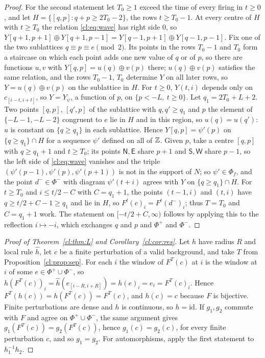 \begin{proof}
For the second statement let $T_0\ge1$ exceed the time of every firing in $t\ge0$, and let $H=\{[q,p]:q+p\ge2T_0-2\}$, the rows $t\ge T_0-1$. At every centre of $H$ with $t\ge T_0$ the relation \eqref{cl:eq:wave} has right side $0$, so $Y[q+1,p+1]\oplus Y[q+1,p-1]=Y[q-1,p+1]\oplus Y[q-1,p-1]$. Fix one of the two sublattices $q\equiv p\equiv e\pmod2$. Its points in the rows $T_0-1$ and $T_0$ form a staircase on which each point adds one new value of $q$ or of $p$, so there are functions $u,v$ with $Y[q,p]=u(q)\oplus v(p)$ there; $u(q)\oplus v(p)$ satisfies the same relation, and the rows $T_0-1$, $T_0$ determine $Y$ on all later rows, so $Y=u(q)\oplus v(p)$ on the sublattice in $H$. For $t\ge0$, $Y(t,i)$ depends only on $c_{[i-t,i+t]}$, so $Y=Y_\psi$, a function of $p$, on $\{p<-L,\ t\ge0\}$. Let $q_1=2T_0+L+2$. Two points $[q,p]$, $[q',p]$ of the sublattice with $q,q'\ge q_1$ and $p$ the element of $\{-L-1,-L-2\}$ congruent to $e$ lie in $H$ and in this region, so $u(q)=u(q')$: $u$ is constant on $\{q\ge q_1\}$ in each sublattice. Hence $Y[q,p]=\psi'(p)$ on $\{q\ge q_1\}\cap H$ for a sequence $\psi'$ defined on all of $\mathbb{Z}$. Given $p$, take a centre $[q,p]$ with $q\ge q_1+1$ and $t\ge T_0$; its points $\mathsf N,\mathsf E$ share $p+1$ and $\mathsf S,\mathsf W$ share $p-1$, so the left side of \eqref{cl:eq:wave} vanishes and the triple $(\psi'(p-1),\psi'(p),\psi'(p+1))$ is not in the support of $N$; so $\psi'\in\Phi_f$, and the point $d^-\in\Phi^-$ with diagram $\psi'(t+i)$ agrees with $Y$ on $\{q\ge q_1\}\cap H$. For $t\ge T_0$ and $i\le t/2-C$ with $C=q_1+1$, the points $(t-1,i)$ and $(t,i)$ have $q\ge t/2+C-1\ge q_1$ and lie in $H$, so $F^t(c)_i=F^t(d^-)_i$; thus $T=T_0$ and $C=q_1+1$ work. The statement on $[-t/2+C,\infty)$ follows by applying this to the reflection $i\mapsto-i$, which exchanges $q$ and $p$ and $\Phi^+$ and $\Phi^-$.
\end{proof}

\begin{proof}[Proof of Theorem~\ref{cl:thm:L} and Corollary~\ref{cl:cor:res}]
Let $h$ have radius $R$ and local rule $\hat h$, let $c$ be a finite perturbation of a valid background, and take $T$ from Proposition~\ref{cl:prop:sep}. For each $i$ the window of $F^T(c)$ at $i$ is the window at $i$ of some $e\in\Phi^+\cup\Phi^-$, so $h(F^T(c))_i=\hat h(e_{[i-R,i+R]})=h(e)_i=e_i=F^T(c)_i$. Hence $F^T(h(c))=h(F^T(c))=F^T(c)$, and $h(c)=c$ because $F$ is bijective. Finite perturbations are dense and $h$ is continuous, so $h=\mathrm{id}$. If $g_1,g_2$ commute with $F$ and agree on $\Phi^+\cup\Phi^-$, the same argument gives $g_1(F^T(c))=g_2(F^T(c))$, hence $g_1(c)=g_2(c)$, for every finite perturbation $c$, and so $g_1=g_2$. For automorphisms, apply the first statement to $h_1^{-1}h_2$.
\end{proof}


